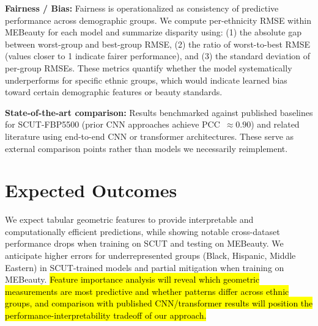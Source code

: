 \documentclass[a4paper,oneside,bibliography=totoc]{scrbook}
\begin{document}
\noindent\textbf{Fairness / Bias:} Fairness is operationalized as consistency of predictive performance across demographic groups. We compute per-ethnicity RMSE within MEBeauty for each model and summarize disparity using: (1) the absolute gap between worst-group and best-group RMSE, (2) the ratio of worst-to-best RMSE (values closer to 1 indicate fairer performance), and (3) the standard deviation of per-group RMSEs. These metrics quantify whether the model systematically underperforms for specific ethnic groups, which would indicate learned bias toward certain demographic features or beauty standards.

\noindent\textbf{State-of-the-art comparison:} Results benchmarked against published baselines for SCUT-FBP5500 (prior CNN approaches achieve PCC~$\approx 0.90$) and related literature using end-to-end CNN or transformer architectures. These serve as external comparison points rather than models we necessarily reimplement.

\section{Expected Outcomes}

We expect tabular geometric features to provide interpretable and computationally efficient predictions, while showing notable cross-dataset performance drops when training on SCUT and testing on MEBeauty. We anticipate higher errors for underrepresented groups (Black, Hispanic, Middle Eastern) in SCUT-trained models and partial mitigation when training on MEBeauty. \hl{Feature importance analysis will reveal which geometric measurements are most predictive and whether patterns differ across ethnic groups, and comparison with published CNN/transformer results will position the performance-interpretability tradeoff of our approach.}


\end{document}
